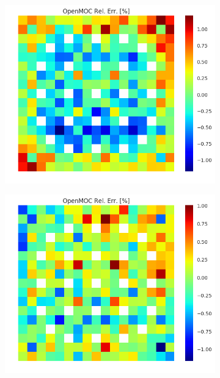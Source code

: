 \begin{figure}[h!]
\begin{subfigure}{.33\textwidth}
  \caption{}
  \label{fig:chap8-assm-1.6-null-capt-70}
\end{subfigure}
\begin{subfigure}{.33\textwidth}
  \centering
  \includegraphics[width=\linewidth]{figures/quantification/assm-16/degenerate-capt-err-2}
  \caption{}
  \label{fig:chap8-assm-1.6-degenerate-capt-2}
\end{subfigure}%
\begin{subfigure}{.33\textwidth}
  \centering
  \includegraphics[width=\linewidth]{figures/quantification/assm-16/degenerate-capt-err-8}

\end{subfigure}
\end{figure}
